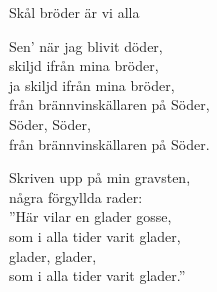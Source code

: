\begin{song}{Skål bröder är vi alla}
	
	\begin{minipage}{\textwidth}
        	\begin{center}
	    \end{center}
	\end{minipage}
	
	\vspace{.5cm}
	
	\showversenumber
    Sen' när jag blivit döder,\\
    skiljd ifrån mina bröder,\\
    ja skiljd ifrån mina bröder,\\
    från brännvinskällaren på Söder,\\
    Söder, Söder,\\
    från brännvinskällaren på Söder.
    
    \showversenumber
    Skriven upp på min gravsten,\\
    några förgyllda rader:\\
    ''Här vilar en glader gosse,\\
    som i alla tider varit glader,\\
    glader, glader,\\
    som i alla tider varit glader.''
	
\end{song}
